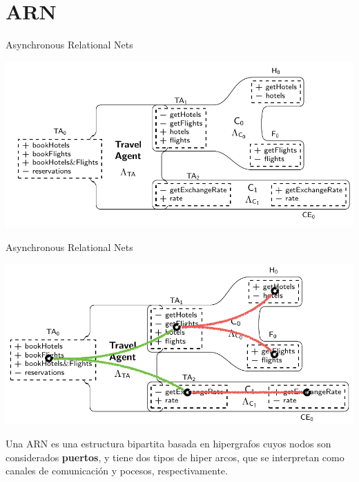 \documentclass[10pt,xcolor={table,dvipsnames},t]{beamer}
\begin{document}
\section{ARN}

\begin{frame}{Asynchronous Relational Nets}
\begin{center}
\includegraphics[scale=0.5]{images/ARN0.png}
\end{center}
\end{frame}

\begin{frame}{Asynchronous Relational Nets \cite{fiadeiro:fase2011}}
\begin{center}
\includegraphics[scale=0.5]{images/ARN1.png}
\end{center}
Una ARN es una estructura bipartita basada en hipergrafos cuyos nodos son considerados \textbf{puertos}, y tiene dos tipos de hiper arcos, que se interpretan como \textcolor{com}{canales de comunicación} y \textcolor{proc}{pocesos}, respectivamente.
\end{frame}
\end{document}
